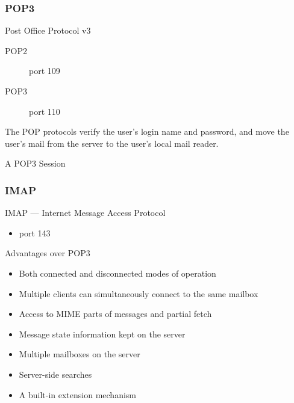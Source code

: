 \begin{frame}
  \begin{center}
  \end{center}
  \label{fig:smtp-pop3}
\end{frame}

\subsubsection{POP3}

\begin{frame}{Post Office Protocol v3}
  \begin{minipage}{.6\linewidth}
    \begin{description}
    \item[POP2] port 109
    \item[POP3] port 110
    \end{description}
    The POP protocols verify the user's login name and password, and move the user's mail
    from the server to the user's local mail reader.
  \end{minipage}\hfill
  \begin{minipage}{.32\linewidth}
    \begin{block}{A POP3 Session}
    \begin{center}
       
    \end{center}
    \label{fig:pop3_session}
  \end{block}
  \end{minipage}
\end{frame}
  
\subsubsection{IMAP}

\begin{frame}{IMAP --- Internet Message Access Protocol}
  \begin{itemize}
  \item port 143
  \end{itemize}
  \begin{block}{Advantages over POP3}
    \begin{itemize}
    \item Both connected and disconnected modes of operation
    \item Multiple clients can simultaneously connect to the same mailbox
    \item Access to MIME parts of messages and partial fetch
    \item Message state information kept on the server
    \item Multiple mailboxes on the server
    \item Server-side searches
    \item A built-in extension mechanism
    \end{itemize}
  \end{block}
\end{frame}

